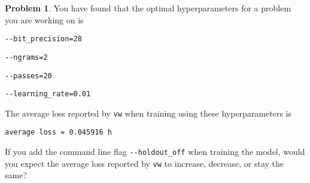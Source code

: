 \documentclass[10pt]{exam}
\theoremstyle{definition}
\newtheorem{problem}{Problem}
\begin{document}
\vspace{3in}
\begin{problem}
    You have found that the optimal hyperparameters for a problem you are working on is
        
        \vspace{0.1in}
        \lstinline{--bit_precision=28}

        \lstinline{--ngrams=2}

        \lstinline{--passes=20}

        \lstinline{--learning_rate=0.01}
        \vspace{0.1in}

    \noindent
    The average loss reported by \lstinline{vw} when training using these hyperparameters is

    \vspace{0.1in}
    \lstinline{average loss = 0.045916 h}

    \vspace{0.1in}
    \noindent
    If you add the command line flag \lstinline{--holdout_off} when training the model, would you expect the average loss reported by \lstinline{vw} to increase, decrease, or stay the same?  
\end{problem}
\end{document}
